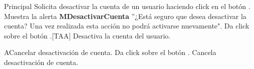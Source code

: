 \begin{UCtrayectoria}{Principal}
  \UCpaso[\UCactor] Solicita desactivar la cuenta de un usuario haciendo click en el botón .
  \UCpaso Muestra la alerta {\bf MDesactivarCuenta} ''¿Está seguro que desea desactivar la cuenta? Una vez realizada esta acción no podrá activarse nuevamente".
  \UCpaso[\UCactor] Da click sobre el botón .[TAA]
  \UCpaso Desactiva la cuenta del usuario.
\end{UCtrayectoria}

\begin{UCtrayectoriaA}{A}{Cancelar desactivación de cuenta.} 
  \UCpaso[\UCactor] Da click sobre el botón .
  \UCpaso Cancela desactivación de cuenta.
\end{UCtrayectoriaA}


